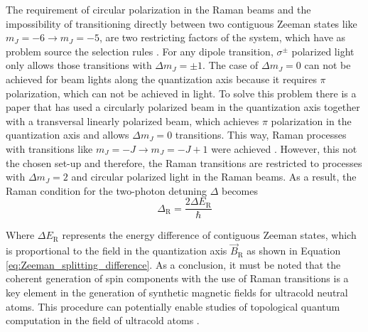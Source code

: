 The requirement of circular polarization in the Raman beams and the impossibility of transitioning directly between two contiguous Zeeman states like $m_J=-6 \rightarrow m_J=-5$, are two restricting factors of the system, which have as problem source the selection rules \cite{Foot2005}. For any dipole transition, $\sigma^\pm$ polarized light only allows those transitions with $\Delta m_{J} = \pm1$. The case of $\Delta m_{J} = 0$ can not be achieved for beam lights along the quantization axis because it requires $\pi$ polarization, which can not be achieved in light. To solve this problem there is a paper that has used a circularly polarized beam in the quantization axis together with a transversal linearly polarized beam, which achieves $\pi$ polarization in the quantization axis and allows $\Delta m_J = 0$ transitions. This way, Raman processes with transitions like $m_{J}=-J \rightarrow m_{J}=-J+1$ were achieved \cite{Debs2009}. However, this not the chosen set-up and therefore, the Raman transitions are restricted to processes with $\Delta m_{J} = 2$ and circular polarized light in the Raman beams. As a result, the Raman condition for the two-photon detuning $\Delta$ becomes
\begin{equation}\label{eq:raman_condition}
	\Delta_\text{R} = \frac{2\Delta E_\text{R}}{\hbar}
\end{equation}

Where $\Delta E_\text{R}$ represents the energy difference of contiguous Zeeman states, which is proportional to the field in the quantization axis $\vec{B}_\text{R}$ as shown in Equation \ref{eq:Zeeman_splitting_difference}. As a conclusion, it must be noted that the coherent generation of spin components with the use of Raman transitions is a key element in the generation of synthetic magnetic fields for ultracold neutral atoms. This procedure can potentially enable studies of topological quantum computation in the field of ultracold atoms \cite{Lin2009, Jimenez2012}.

